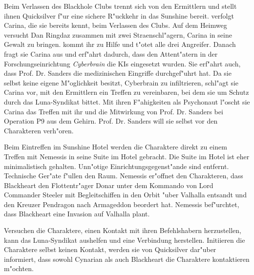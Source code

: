 

Beim Verlassen des Blackhole Clubs trennt sich \xl{} von den Ermittlern und stellt ihnen Quicksilver f"ur eine sichere R"uckkehr in das Sunshine bereit. \xl{} verfolgt Carina, die sie bereits kennt, beim Verlassen des Clubs. Auf dem Heimweg versucht Dan Ringdaz zusammen mit zwei Stra\3enschl"agern, Carina in seine Gewalt zu bringen. \xl{} kommt ihr zu Hilfe und t"otet alle drei Angreifer. Danach fragt sie Carina aus und erf"ahrt dadurch, dass den Attent"atern in der Forschungseinrichtung \emph{Cyberbrain} die KIs eingesetzt wurden. Sie erf"ahrt auch, dass Prof. Dr. Sanders die medizinischen Eingriffe durchgef"uhrt hat. Da sie selbst keine eigene M"oglichkeit besitzt, Cyberbrain zu infiltrieren, schl"agt sie Carina vor, mit den Ermittlern ein Treffen zu vereinbaren, bei dem sie um Schutz durch das Luna-Syndikat bittet. Mit ihren F"ahigkeiten als Psychonaut l"oscht sie Carina das Treffen mit ihr und die Mitwirkung von Prof. Dr. Sanders bei Operation P9 aus dem Gehirn. Prof. Dr. Sanders will sie selbst vor den Charakteren verh"oren.


Beim Eintreffen im Sunshine Hotel werden die Charaktere direkt zu einem Treffen mit Nemessis in seine Suite im Hotel gebracht. Die Suite im Hotel ist eher minimalistisch gehalten. Unn"otige Einrichtungsgegenst"ande sind entfernt. Technische Ger"ate f"ullen den Raum. Nemessis er"offnet den Charakteren, dass Blackheart den Flottentr"ager Donar unter dem Kommando von Lord Commander Steeler mit Begleitschiffen in den Orbit "uber Valhalla entsandt und den Kreuzer Pendragon nach Armageddon beordert hat. Nemessis bef"urchtet, dass Blackheart eine Invasion auf Valhalla plant.

Versuchen die Charaktere, einen Kontakt mit ihren Befehlshabern herzustellen, kann das Luna-Syndikat aushelfen und eine Verbindung herstellen. Initiieren die Charaktere selbst keinen Kontakt, werden sie von Quicksilver dar"uber informiert, dass sowohl Cynarian als auch Blackheart die Charaktere kontaktieren m"ochten.


